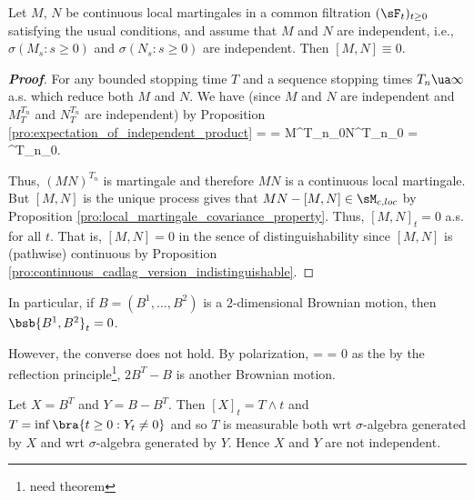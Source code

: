 




\begin{proposition}\label{pro:independent_local_martingale_covariation}
Let $M$, $N$ be continuous local martingales in a common filtration $(\sF_t)_{t \geq 0}$ satisfying the usual conditions, and assume that $M$ and $N$ are independent, i.e., $\sigma(M_s: s \geq 0)$ and $\sigma(N_s: s \geq 0)$ are independent. Then $[M,N] \equiv 0$.
\end{proposition}


\begin{proof}[\bf Proof]
For any bounded stopping time $T$ and a sequence stopping times $T_n\ua \infty$ a.s. which reduce both $M$ and $N$. We have (since $M$ and $N$ are independent and $M^{T_n}_T$ and $N^{T_n}_T$ are independent) by Proposition \ref{pro:expectation_of_independent_product}
\be
\E{} = \E{} = \E{}\E{}  M^{T_n}_0N^{T_n}_0  = ^{T_n}_0. %
\ee

Thus, $(MN)^{T_n}$ is martingale and therefore $MN$ is a continuous local martingale. But $[M,N]$ is the unique process gives that $MN- [M,N] \in \sM_{c,loc}$ by Proposition \ref{pro:local_martingale_covariance_property}. Thus, $[M,N]_t = 0$ a.s. for all $t$. That is, $[M,N] = 0$ in the sence of distinguishability since $[M,N]$ is (pathwise) continuous by Proposition \ref{pro:continuous_cadlag_version_indistinguishable}.
\end{proof}

\begin{remark}
In particular, if $B = (B^1,\dots,B^2)$ is a $2$-dimensional Brownian motion, then $\bsb{B^1,B^2}_t = 0$.

However, the converse does not hold. By polarization,
\be
{} =   = 0
\ee
as the by the reflection principle\footnote{need theorem}, $2B^T - B$ is another Brownian motion.

Let $X = B^T$ and $Y = B-B^T$. Then $[X]_t = T\land t$ and $T = \inf\bra{t\geq 0:Y_t \neq 0}$ and so $T$ is measurable both wrt $\sigma$-algebra generated by $X$ and wrt $\sigma$-algebra generated by $Y$. Hence $X$ and $Y$ are not independent.
\end{remark}



